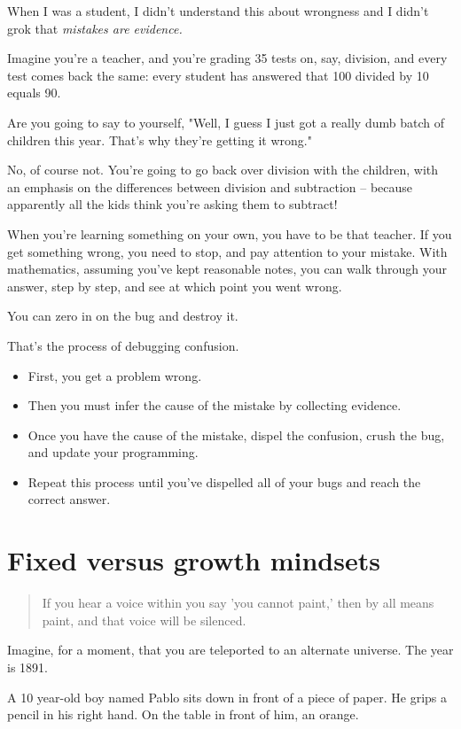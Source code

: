 When I was a student, I didn't understand this about wrongness and I didn't grok
that \textit{mistakes are evidence.}

Imagine you're a teacher, and you're grading 35 tests on, say, division,
and every test comes back the same: every student has answered that 100 divided
by 10 equals 90.

Are you going to say to yourself, "Well, I guess I just got a really dumb batch
of children this year. That's why they're getting it wrong."

No, of course not. You're going to go back over division with the children, with
an emphasis on the differences between division and subtraction -- because
apparently all the kids think you're asking them to subtract!

When you're learning something on your own, you have to be that teacher. If you
get something wrong, you need to stop, and pay attention to your mistake. With
mathematics, assuming you've kept reasonable notes, you can walk through your
answer, step by step, and see at which point you went wrong.

You can zero in on the bug and destroy it.

That's the process of debugging confusion.

\begin{itemize}
\item First, you get a problem wrong.
\item Then you must infer the cause of the mistake by collecting evidence.
\item Once you have the cause of the mistake, dispel the confusion, crush the bug,
  and update your programming.
\item Repeat this process until you've dispelled all of your bugs and reach the
  correct answer.
\end{itemize}

\section{Fixed versus growth mindsets}

\begin{quote}
  If you hear a voice within you say 'you cannot paint,' then by all means
  paint, and that voice will be silenced.
\end{quote}

Imagine, for a moment, that you are teleported to an alternate universe. The
year is 1891.

A 10 year-old boy named Pablo sits down in front of a piece of paper. He grips a
pencil in his right hand. On the table in front of him, an orange.

